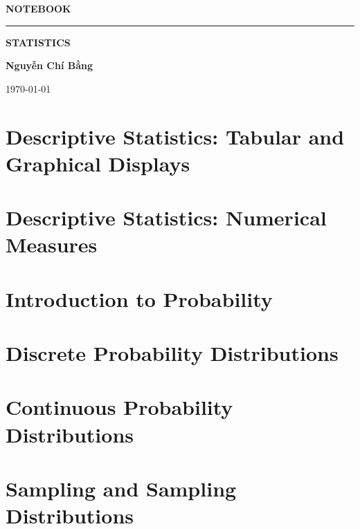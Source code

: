 \documentclass[12pt,a4paper]{report}
\begin{document}
 
    \begin{titlepage}
	\centering
    \phantom{}\par
	\vspace{3cm}
	{\LARGE\textbf{NOTEBOOK}\par}
	\vspace{1cm}
	\rule{5cm}{0.5pt}\par
	\vspace{1cm}
		{\LARGE\textbf{STATISTICS}\par}
	\vspace{1cm}
	\Large\textbf{Nguyễn Chí Bằng}\par		
	\vspace{1cm}
    \today
    \end{titlepage}


	\tableofcontents

	\thispagestyle{empty} %
	\mbox{}

\chapter{Descriptive Statistics: Tabular and Graphical Displays}

\chapter{Descriptive Statistics: Numerical Measures}

\chapter{Introduction to Probability}

\chapter{Discrete Probability Distributions}

\chapter{Continuous Probability Distributions}

\chapter{Sampling and Sampling Distributions}
\end{document}
